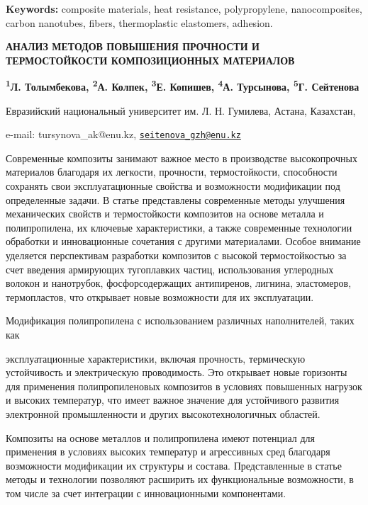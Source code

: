 {\bfseries Keywords:} composite materials, heat resistance, polypropylene,
nanocomposites, carbon nanotubes, fibers, thermoplastic elastomers,
adhesion.

\begin{articleheader}
{\bfseries АНАЛИЗ МЕТОДОВ ПОВЫШЕНИЯ ПРОЧНОСТИ И ТЕРМОСТОЙКОСТИ
КОМПОЗИЦИОННЫХ МАТЕРИАЛОВ}

{\bfseries
\textsuperscript{1}Л. Толымбекова,
\textsuperscript{2}А. Колпек,
\textsuperscript{3}Е. Копишев,
\textsuperscript{4}А. Турсынова\textsuperscript{\envelope },
\textsuperscript{5}Г. Сейтенова\textsuperscript{\envelope }
}
\end{articleheader}

\begin{affiliation}
Евразийский национальный университет им. Л. Н. Гумилева, Астана, Казахстан,

e-mail: tursynova\_ak@enu.kz, \href{mailto:seitenova_gzh@enu.kz}{\nolinkurl{seitenova\_gzh@enu.kz}}
\end{affiliation}

Современные композиты занимают важное место в производстве высокопрочных
материалов благодаря их легкости, прочности, термостойкости, способности
сохранять свои эксплуатационные свойства и возможности модификации под
определенные задачи. В статье представлены современные методы улучшения
механических свойств и термостойкости композитов на основе металла и
полипропилена, их ключевые характеристики, а также современные
технологии обработки и инновационные сочетания с другими материалами.
Особое внимание уделяется перспективам разработки композитов с высокой
термостойкостью за счет введения армирующих тугоплавких частиц,
использования углеродных волокон и нанотрубок, фосфорсодержащих
антипиренов, лигнина, эластомеров, термопластов, что открывает новые
возможности для их эксплуатации.

Модификация полипропилена с использованием различных наполнителей, таких
как

эксплуатационные характеристики, включая прочность, термическую
устойчивость и электрическую проводимость. Это открывает новые горизонты
для применения полипропиленовых композитов в условиях повышенных
нагрузок и высоких температур, что имеет важное значение для устойчивого
развития электронной промышленности и других высокотехнологичных
областей.

Композиты на основе металлов и полипропилена имеют потенциал для
применения в условиях высоких температур и агрессивных сред благодаря
возможности модификации их структуры и состава. Представленные в статье
методы и технологии позволяют расширить их функциональные возможности, в
том числе за счет интеграции с инновационными компонентами.

